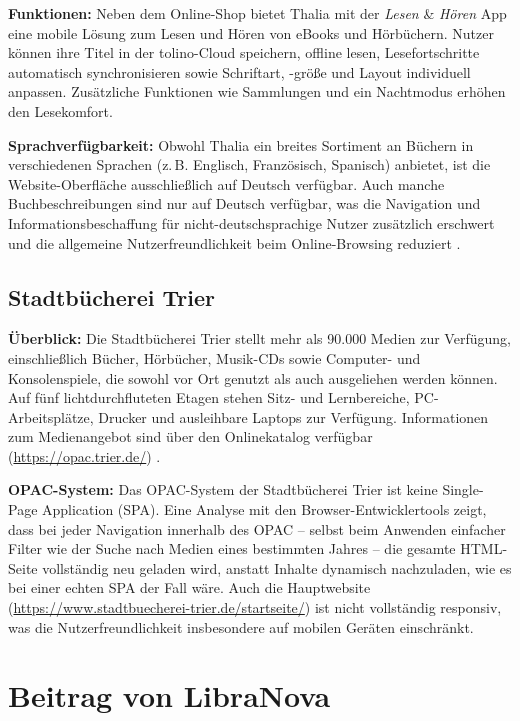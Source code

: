 \noindent \textbf{Funktionen:} Neben dem Online-Shop bietet Thalia mit der \emph{Lesen} \& \emph{Hören} App eine mobile Lösung zum Lesen und Hören von eBooks und Hörbüchern. Nutzer können ihre Titel in der tolino-Cloud speichern, offline lesen, Lesefortschritte automatisch synchronisieren sowie Schriftart, -größe und Layout individuell anpassen. Zusätzliche Funktionen wie Sammlungen und ein Nachtmodus erhöhen den Lesekomfort\cite{thaliaUnternehmen2025b}.


\noindent \textbf{Sprachverfügbarkeit:} Obwohl Thalia ein breites Sortiment an Büchern in verschiedenen Sprachen (z.\,B. Englisch, Französisch, Spanisch) anbietet, ist die Website-Oberfläche ausschließlich auf Deutsch verfügbar. Auch manche Buchbeschreibungen sind nur auf Deutsch verfügbar, was die Navigation und Informationsbeschaffung für nicht-deutschsprachige Nutzer zusätzlich erschwert und die allgemeine Nutzerfreundlichkeit beim Online-Browsing reduziert \cite{thaliaUnternehmen2025c}.

\subsection{Stadtbücherei Trier}

\textbf{Überblick:} Die Stadtbücherei Trier stellt mehr als 90.000 Medien zur Verfügung, einschließlich Bücher, Hörbücher, Musik-CDs sowie Computer- und Konsolenspiele, die sowohl vor Ort genutzt als auch ausgeliehen werden können. Auf fünf lichtdurchfluteten Etagen stehen Sitz- und Lernbereiche, PC-Arbeitsplätze, Drucker und ausleihbare Laptops zur Verfügung. Informationen zum Medienangebot sind über den Onlinekatalog verfügbar (\url{https://opac.trier.de/}) \cite{stadtbuechereiTrier2025}.

\noindent \textbf{OPAC-System:} Das OPAC-System der Stadtbücherei Trier ist keine Single-Page Application (SPA). Eine Analyse mit den Browser-Entwicklertools zeigt, dass bei jeder Navigation innerhalb des OPAC – selbst beim Anwenden einfacher Filter wie der Suche nach Medien eines bestimmten Jahres – die gesamte HTML-Seite vollständig neu geladen wird, anstatt Inhalte dynamisch nachzuladen, wie es bei einer echten SPA der Fall wäre. Auch die Hauptwebsite (\url{https://www.stadtbuecherei-trier.de/startseite/}) ist nicht vollständig responsiv, was die Nutzerfreundlichkeit insbesondere auf mobilen Geräten einschränkt.

\section{Beitrag von LibraNova}

